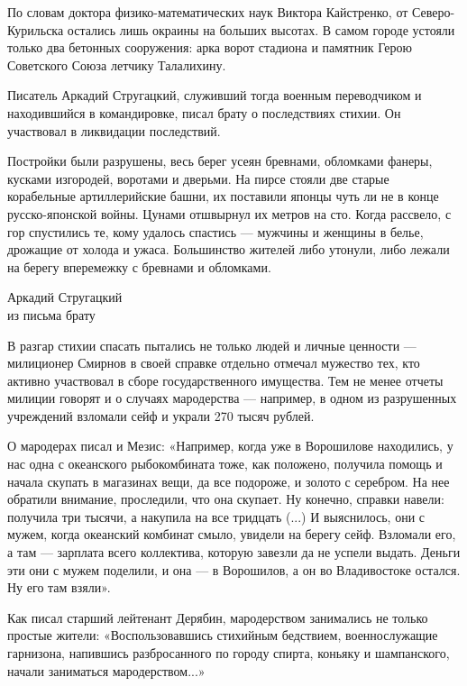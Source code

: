 По словам доктора физико-математических наук Виктора Кайстренко, от Северо-Курильска остались лишь окраины на больших высотах. В самом городе устояли только два бетонных сооружения: арка ворот стадиона и памятник Герою Советского Союза летчику Талалихину.

Писатель Аркадий Стругацкий, служивший тогда военным переводчиком и находившийся в командировке, писал брату о последствиях стихии. Он участвовал в ликвидации последствий.

\begin{fancyquotes}
    Постройки были разрушены, весь берег усеян бревнами, обломками фанеры, кусками изгородей, воротами и дверьми. На пирсе стояли две старые корабельные артиллерийские башни, их поставили японцы чуть ли не в конце русско-японской войны. Цунами отшвырнул их метров на сто. Когда рассвело, с гор спустились те, кому удалось спастись --- мужчины и женщины в белье, дрожащие от холода и ужаса. Большинство жителей либо утонули, либо лежали на берегу вперемежку с бревнами и обломками.\\

    \begin{flushright}
        Аркадий Стругацкий
        \\
        из письма брату
    \end{flushright}
\end{fancyquotes}

В разгар стихии спасать пытались не только людей и личные ценности --- милиционер Смирнов в своей справке отдельно отмечал мужество тех, кто активно участвовал в сборе государственного имущества. Тем не менее отчеты милиции говорят и о случаях мародерства --- например, в одном из разрушенных учреждений взломали сейф и украли 270 тысяч рублей.

О мародерах писал и Мезис: «Например, когда уже в Ворошилове находились, у нас одна с океанского рыбокомбината тоже, как положено, получила помощь и начала скупать в магазинах вещи, да все подороже, и золото с серебром. На нее обратили внимание, проследили, что она скупает. Ну конечно, справки навели: получила три тысячи, а накупила на все тридцать (...) И выяснилось, они с мужем, когда океанский комбинат смыло, увидели на берегу сейф. Взломали его, а там --- зарплата всего коллектива, которую завезли да не успели выдать. Деньги эти они с мужем поделили, и она --- в Ворошилов, а он во Владивостоке остался. Ну его там взяли».

Как писал старший лейтенант Дерябин, мародерством занимались не только простые жители: «Воспользовавшись стихийным бедствием, военнослужащие гарнизона, напившись разбросанного по городу спирта, коньяку и шампанского, начали заниматься мародерством...»


